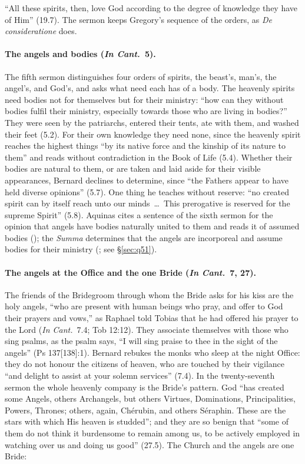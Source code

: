 \noindent ``All these spirits, then, love God according to the degree of
knowledge they have of Him'' (19.7). The sermon keeps Gregory's sequence of
the orders, as \emph{De consideratione} does.

\paragraph{The angels and bodies (\emph{In Cant.}\ 5).} The fifth sermon
distinguishes four orders of spirits, the beast's, man's, the angel's, and
God's, and asks what need each has of a body. The heavenly spirits need
bodies not for themselves but for their ministry: ``how can they without
bodies fulfil their ministry, especially towards those who are living in
bodies?'' They were seen by the patriarchs, entered their tents, ate with
them, and washed their feet (5.2). For their own knowledge they need none,
since the heavenly spirit reaches the highest things ``by its native force
and the kinship of its nature to them'' and reads without contradiction in
the Book of Life (5.4). Whether their bodies are natural to them, or are
taken and laid aside for their visible appearances, Bernard declines to
determine, since ``the Fathers appear to have held diverse opinions''
(5.7). One thing he teaches without reserve: ``no created spirit can by
itself reach unto our minds~\dots\ This prerogative is reserved for the
supreme Spirit'' (5.8). Aquinas cites a sentence of the sixth sermon for the
opinion that angels have bodies naturally united to them and reads it of
assumed bodies (); the \emph{Summa} determines
that the angels are incorporeal and assume bodies for their ministry
(; see \S\ref{sec:q51}).

\paragraph{The angels at the Office and the one Bride (\emph{In Cant.}\ 7,
27).} The friends of the Bridegroom through whom the Bride asks for his
kiss are the holy angels, ``who are present with human beings who pray, and
offer to God their prayers and vows,'' as Raphael told Tobias that he had
offered his prayer to the Lord (\emph{In Cant.}\ 7.4; Tob 12:12). They
associate themselves with those who sing psalms, as the psalm says, ``I will sing praise to thee in the sight of the angels''
(Ps 137[138]:1).
Bernard rebukes the monks who sleep at the night Office: they do not honour
the citizens of heaven, who are touched by their vigilance ``and delight to
assist at your solemn services'' (7.4). In the twenty-seventh sermon the
whole heavenly company is the Bride's pattern. God ``has created some
Angels, others Archangels, but others Virtues, Dominations, Principalities,
Powers, Thrones; others, again, Chérubin, and others Séraphin. These are the
stars with which His heaven is studded''; and they are so benign that
``some of them do not think it burdensome to remain among us, to be actively
employed in watching over us and doing us good'' (27.5). The Church and the
angels are one Bride:

